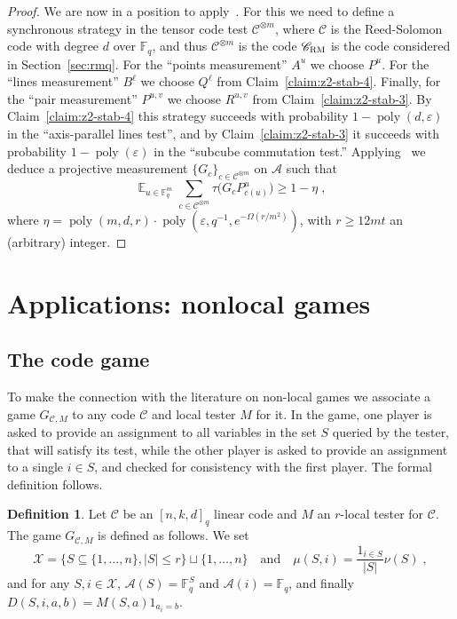 \documentclass[11pt]{article}
\theoremstyle{definition}
\newtheorem{definition}[theorem]{Definition}
\newcommand{\code}{\mathscr{C}}
\DeclareMathOperator*{\Expectation}{\mathbb{E}}
\newcommand{\Es}[1]{\Expectation_{#1}}
\newcommand{\F}{\ensuremath{\mathbb{F}}}
\newcommand{\mA}{\ensuremath{\mathcal{A}}}
\newcommand{\mX}{\ensuremath{\mathcal{X}}}
\newcommand{\RM}{\ensuremath{\textsc{RM}}}
\DeclareMathOperator{\poly}{poly}
\newcommand{\eps}{\varepsilon}
\begin{document}
\begin{proof}
We are now in a position to apply~\cite[Theorem 4.1]{ji2022quantum}. For this we need to define a synchronous strategy in the tensor code test $\code^{\otimes m}$, where $\code$ is the Reed-Solomon code with degree $d$ over $\F_q$, and thus $\code^{\otimes m}$ is the code $\code_\RM$ is the code considered in Section~\ref{sec:rmq}. For the ``points measurement'' $A^u$ we choose $P^u$. For the ``lines measurement'' $B^\ell$ we choose $Q^\ell$ from Claim~\ref{claim:z2-stab-4}. Finally, for the ``pair measurement'' $P^{u,v}$ we choose $R^{u,v}$ from Claim~\ref{claim:z2-stab-3}. By Claim~\ref{claim:z2-stab-4} this strategy succeeds with probability $1-\poly(d,\eps)$ in the ``axis-parallel lines test'', and by Claim~\ref{claim:z2-stab-3} it succeeds with probability $1-\poly(\eps)$ in the ``subcube commutation test.'' Applying~\cite[Theorem 4.1]{ji2022quantum} we deduce a projective measurement $\{G_c\}_{c\in\code^{\otimes m}}$ on $\mA$ such that
\[ \Es{u\in\F_q^m} \sum_{c\in\code^{\otimes m}} \tau\big( G_c P^u_{c(u)}\big) \geq 1-\eta\;,\]
where $\eta = \poly(m,d,r) \cdot\poly(\eps,q^{-1},e^{-\Omega(r/m^2)})$, with $r\geq 12mt$ an (arbitrary) integer.

\end{proof}








\section{Applications: nonlocal games}
	

\subsection{The code game}

To make the connection with the literature on non-local games we associate a game $G_{\code,M}$ to any code $\code$ and local tester $M$ for it. In the game, one player is asked to provide an assignment to all variables in the set $S$ queried by the tester, that will satisfy its test, while the other player is asked to provide an assignment to a single $i\in S$, and checked for consistency with the first player. The formal definition follows.  

\begin{definition}
Let $\code$ be an $[n,k,d]_q$ linear code and $M$ an $r$-local tester for $\code$. The game $G_{\code,M}$ is defined as follows. We set 
\[\mX = \{ S\subseteq \{1,\ldots,n\},|S|\leq r\} \sqcup\{1,\ldots,n\}\quad\text{and}\quad \mu(S,i)=\frac{1_{i\in S}}{|S|}\nu(S)\;,\]
and for any $S,i\in\mX$, $\mA(S)=\F_q^S$ and $\mA(i)=\F_q$, and finally $D(S,i,a,b)=M(S,a)1_{a_i=b}$. 
\end{definition}
\end{document}
